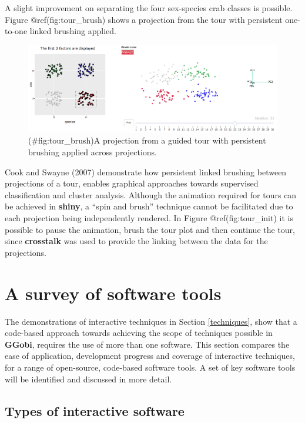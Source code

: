 \documentclass[]{book}
\theoremstyle{definition}
\theoremstyle{definition}
\theoremstyle{definition}
\theoremstyle{remark}
\begin{document}
A slight improvement on separating the four sex-species crab classes is
possible. Figure @ref(fig:tour\_brush) shows a projection from the tour
with persistent one-to-one linked brushing applied.

\begin{figure}[htbp]
\centering
\includegraphics{files/tour_brush.jpg}
\caption{(\#fig:tour\_brush)A projection from a guided tour with
persistent brushing applied across projections.}
\end{figure}

Cook and Swayne (2007) demonstrate how persistent linked brushing
between projections of a tour, enables graphical approaches towards
supervised classification and cluster analysis. Although the animation
required for tours can be achieved in \textbf{shiny}, a ``spin and
brush'' technique cannot be facilitated due to each projection being
independently rendered. In Figure @ref(fig:tour\_init) it is possible to
pause the animation, brush the tour plot and then continue the tour,
since \textbf{crosstalk} was used to provide the linking between the
data for the projections.

\chapter{A survey of software tools}\label{software}

The demonstrations of interactive techniques in Section
\ref{techniques}, show that a code-based approach towards achieving the
scope of techniques possible in \textbf{GGobi}, requires the use of more
than one software. This section compares the ease of application,
development progress and coverage of interactive techniques, for a range
of open-source, code-based software tools. A set of key software tools
will be identified and discussed in more detail.

\section{Types of interactive software}\label{types}
\end{document}
